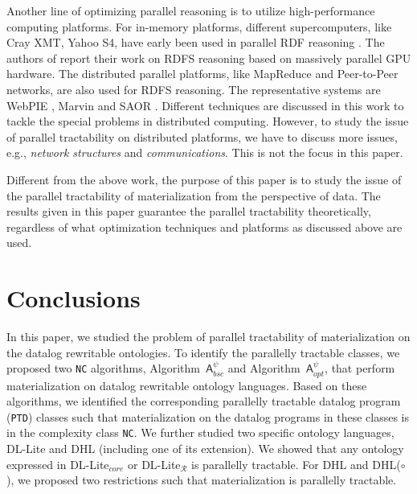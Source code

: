 \documentclass[final,1p,times]{elsarticle}
\begin{document}
Another line of optimizing parallel reasoning is to utilize high-performance computing platforms. For in-memory platforms, different supercomputers, like Cray XMT, Yahoo S4, have early been used in parallel RDF reasoning \cite{Hoeksema2011,GoodmanJMAAH11}. The authors of \cite{HeinoP12} report their work on RDFS reasoning based on massively parallel GPU hardware. The distributed parallel platforms, like MapReduce and Peer-to-Peer networks, are also used for RDFS reasoning. The representative systems are WebPIE \cite{UrbaniKMHB12}, Marvin \cite{oren2009marvin} and SAOR \cite{HoganHP09}. Different techniques are discussed in this work to tackle the special problems in distributed computing. However, to study the issue of parallel tractability on distributed platforms, we have to discuss more issues, e.g., \emph{network structures} and \emph{communications}. This is not the focus in this paper.

Different from the above work, the purpose of this paper is to study the issue of the parallel tractability of materialization from the perspective of data. The results given in this paper guarantee the parallel tractability theoretically, regardless of what optimization techniques and platforms as discussed above are used.


\section{Conclusions}
\label{sec:conclusion}

In this paper, we studied the problem of parallel tractability of
materialization on the datalog rewritable ontologies.
To identify the parallelly tractable classes,
we proposed two \texttt{NC} algorithms, Algorithm~$\mathsf{A}_{bsc}^\psi$
and Algorithm~$\mathsf{A}_{opt}^\psi$, that perform materialization on
datalog rewritable ontology languages.
Based on these algorithms, we identified the corresponding
parallelly tractable datalog program (\texttt{PTD}) classes such that materialization
on the datalog programs in these classes is in the complexity class \texttt{NC}.
We further studied two specific ontology languages, DL-Lite and DHL (including one of its extension).
We showed that any ontology expressed in DL-Lite$_{core}$ or DL-Lite$_{\mathcal{R}}$ is parallelly tractable.
For DHL and DHL($\circ$), we proposed two restrictions such that materialization is parallelly tractable.
\end{document}
